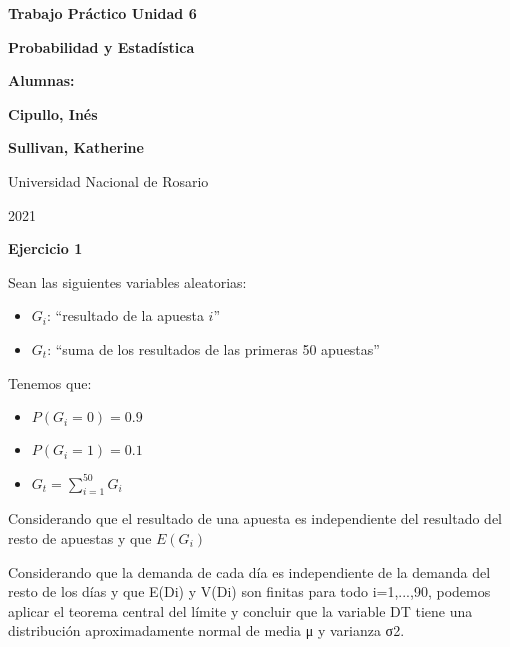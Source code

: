 \documentclass[11pt]{article}
\begin{document}
\begin{titlepage}
    \begin{center}
        \vfill
        \vfill
            \vspace{0.7cm}
            \noindent\textbf{\Huge Trabajo Pr\'actico Unidad 6}\par
            \noindent\textbf{\Huge Probabilidad y Estad\'istica}\par
            \vspace{.5cm}
        \vfill
        \noindent \textbf{\huge Alumnas:}\par
        \vspace{.5cm}
        \noindent \textbf{\Large Cipullo, In\'es}\par
        \noindent \textbf{\Large Sullivan, Katherine}\par
 
        \vfill
        \large Universidad Nacional de Rosario \par
        \noindent\large 2021
    \end{center}
\end{titlepage}
\par


\textbf{Ejercicio 1}

Sean las siguientes variables aleatorias:
\begin{itemize}
    \item $G_i$: ``resultado de la apuesta $i$''
    \item $G_t$: ``suma de los resultados de las primeras 50 apuestas''

\end{itemize}

Tenemos que:
\begin{itemize}
    \item $P(G_i = 0) = 0.9$
    \item $P(G_i = 1) = 0.1$
    \item $G_t = \sum_{i = 1}^{50} G_i$
\end{itemize}

Considerando que el resultado de una apuesta es independiente del resultado del resto de apuestas y que $E(G_i)$ 

Considerando que la demanda de cada día es independiente de la demanda del resto de los días y que E(Di) y V(Di) son finitas para todo i=1,...,90, 
podemos aplicar el teorema central del límite y concluir que la variable DT tiene una distribución aproximadamente normal de media μ y varianza σ2.
\end{document}
